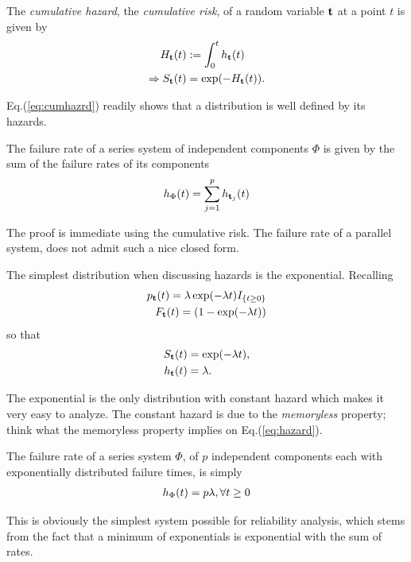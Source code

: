 \begin{definition}
The \emph{cumulative hazard}, \aka the \emph{cumulative risk}, of a random variable $\mathbf{t}$ at a point $t$ is given by 
\begin{align}
	H_{\mathbf{t}} (t) &:= \int_{0}^{t}h_{\mathbf{t}} (t) \\
	\Rightarrow S_{\mathbf{t}} (t) &= \exp(-H_{\mathbf{t}} (t)). \label{eq:cumhazrd}
\end{align}
\end{definition}
Eq.(\ref{eq:cumhazrd}) readily shows that a distribution is well defined by its hazards.



\begin{theorem}
The failure rate of a series system of independent components $\Phi$ is given by the sum of the failure rates of its components
\begin{align}
	h_{\Phi} (t)= \sum_{j=1}^{p} h_{\mathbf{t}_j} (t)
\end{align}
\end{theorem}
The proof is immediate using the cumulative risk.
The failure rate of a parallel system, does not admit such a nice closed form.

\begin{example}
The simplest distribution when discussing hazards is the exponential.
Recalling
\begin{align}
	p_{\mathbf{t}} (t)= \lambda \exp(-\lambda t) I_{\{ t \geq 0 \}} \\
	F_{\mathbf{t}} (t)= (1-\exp(-\lambda t)) 
\end{align}
so that 
\begin{align}
	S_{\mathbf{t}} (t) &= \exp(-\lambda t), \\
	h_{\mathbf{t}} (t) &= \lambda.
\end{align}
\end{example}
The exponential is the only distribution with constant hazard which makes it very easy to analyze.
The constant hazard is due to the \emph{memoryless} property; think what the memoryless property implies on Eq.(\ref{eq:hazard}).



\begin{example}
The failure rate of a series system $\Phi$, of $p$ independent components each with exponentially distributed failure times, is simply 
\begin{align}
	h_{\Phi} (t)= p \lambda, \forall t \geq 0
\end{align}
\end{example}
This is obviously the simplest system possible for reliability analysis, which stems from the fact that a minimum of exponentials is exponential with the sum of rates.



